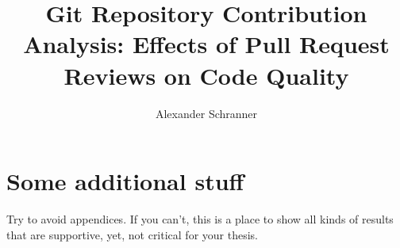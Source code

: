 \documentclass[bachelor]{padsthesis}
\begin{document}
\author{Alexander Schranner}
\title{Git Repository Contribution Analysis: Effects of Pull Request Reviews on Code Quality}

\maketitle

\frontmatter





\tableofcontents
\listoffigures
\listoftables

\mainmatter

















\appendix
\chapter{Some additional stuff}
Try to avoid appendices.
If you can't, this is a place to show all kinds of results that are supportive, yet, not critical for your thesis.

\backmatter
\printbibliography
\end{document}
